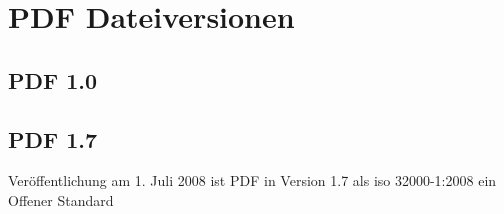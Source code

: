\section{PDF Dateiversionen}

\subsection{PDF 1.0}


\subsection{PDF 1.7}
Veröffentlichung am 1. Juli 2008 ist PDF in Version 1.7 als \gls{iso} 32000-1:2008 ein Offener Standard